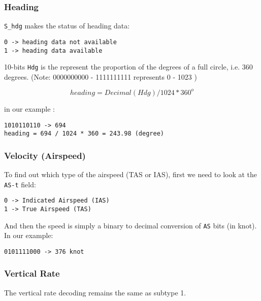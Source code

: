 \subsubsection{Heading}\label{heading}

\texttt{S\_hdg} makes the status of heading data:

\begin{verbatim}
0 -> heading data not available
1 -> heading data available
\end{verbatim}

10-bits \texttt{Hdg} is the represent the proportion of the degrees of a
full circle, i.e. 360 degrees. (Note: 0000000000 - 1111111111 represents
0 - 1023 )

\[heading = Decimal(Hdg) / 1024 * 360^o\]

in our example :

\begin{verbatim}
1010110110 -> 694
heading = 694 / 1024 * 360 = 243.98 (degree)
\end{verbatim}

\subsubsection{Velocity (Airspeed)}\label{velocity-airspeed}

To find out which type of the airspeed (TAS or IAS), first we need to
look at the \texttt{AS-t} field:

\begin{verbatim}
0 -> Indicated Airspeed (IAS)
1 -> True Airspeed (TAS)
\end{verbatim}

And then the speed is simply a binary to decimal conversion of
\texttt{AS} bits (in knot). In our example:

\begin{verbatim}
0101111000 -> 376 knot
\end{verbatim}

\subsubsection{Vertical Rate}\label{vertical-rate-1}

The vertical rate decoding remains the same as subtype 1.
